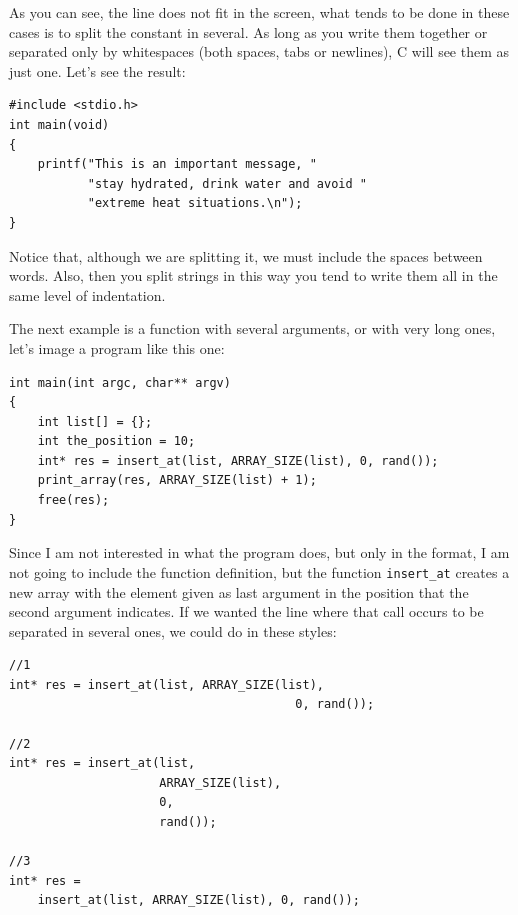 \documentclass[a4paper]{article}
\begin{document}
As you can see, the line does not fit in the screen, what tends to be done in
these cases is to split the constant in several. As long as you write them
together or separated only by whitespaces (both spaces, tabs or newlines), C
will see them as just one. Let's see the result:

\noindent
\begin{minipage}[H]{\linewidth}
\mbox{}
\begin{lstlisting}[style=C,
caption={Splitting a long printing instruction},
label={lst:longprint}]
#include <stdio.h>
int main(void)
{
    printf("This is an important message, "
           "stay hydrated, drink water and avoid "
           "extreme heat situations.\n");
}
\end{lstlisting}
\end{minipage}

Notice that, although we are splitting it, we must include the spaces between
words. Also, then you split strings in this way you tend to write them all
in the same level of indentation.

The next example is a function with several arguments, or with very long ones,
let's image a program like this one:

\noindent
\begin{minipage}[H]{\linewidth}
\mbox{}
\begin{lstlisting}[style=C,
caption={Example of a call with several arguments},
label={lst:manyArgs}]
int main(int argc, char** argv)
{
    int list[] = {};
    int the_position = 10;
    int* res = insert_at(list, ARRAY_SIZE(list), 0, rand());
    print_array(res, ARRAY_SIZE(list) + 1);
    free(res);
}
\end{lstlisting}
\end{minipage}

Since I am not interested in what the program does, but only in the format, I am
not going to include the function definition, but the function \verb!insert_at!
creates a new array with the element given as last argument in the position that
the second argument indicates. If we wanted the line where that call occurs
to be separated in several ones, we could do in these styles:

\noindent
\begin{minipage}[H]{\linewidth}
\mbox{}
\begin{lstlisting}[style=C,
caption={Splitting of call with several arguments},
label={lst:manyArgsShorting}]
//1
int* res = insert_at(list, ARRAY_SIZE(list),
                                        0, rand());

//2
int* res = insert_at(list,
                     ARRAY_SIZE(list),
                     0,
                     rand());

//3
int* res =
    insert_at(list, ARRAY_SIZE(list), 0, rand());
\end{lstlisting}
\end{minipage}
\end{document}
